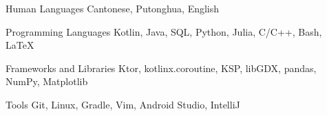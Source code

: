 

\begin{cvskills}

  \cvskill
    {Human Languages} %
    {Cantonese, Putonghua, English} %

  \cvskill
    {Programming Languages} %
    {Kotlin, Java, SQL, Python, Julia, C/C++, Bash, \LaTeX} %

  \cvskill
    {Frameworks and Libraries} %
    {Ktor, kotlinx.coroutine, KSP, libGDX, pandas, NumPy, Matplotlib} %

  \cvskill
    {Tools} %
    {Git, Linux, Gradle, Vim, Android Studio, IntelliJ} %

\end{cvskills}
